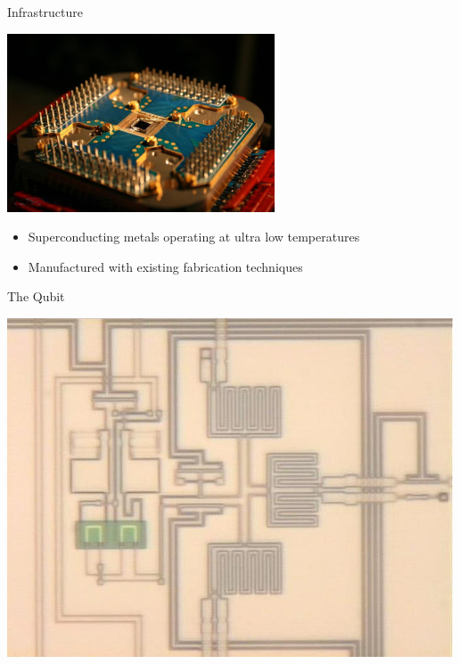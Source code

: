 \documentclass{beamer}
\begin{document}
\begin{frame}{Infrastructure}

  \begin{center}
 \includegraphics[scale=.2]{../img/13073_D_Wave_Orion_16_Qubit}
 \end{center}
 
 \begin{itemize}
  \item Superconducting metals operating at ultra low temperatures
  \item Manufactured with existing fabrication techniques
 \end{itemize}

\end{frame}

\begin{frame}{The Qubit}
 \begin{center}
  \includegraphics[scale=.7]{../img/Real_Qubit}
 \end{center}

\end{frame}
\end{document}
